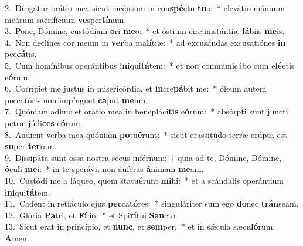 {2.~}Dirigátur orátio mea sicut incénsum in con\textbf{spé}ctu \textbf{tu}o:~* elevátio mánuum meárum sacrifícium \textbf{ve}sper\textbf{tí}num.\\
{3.~}Pone, Dómine, custódiam \textbf{o}ri \textbf{me}o:~* et óstium circumstántiæ \textbf{lá}biis \textbf{me}is.\\
{4.~}Non declínes cor meum in \textbf{ver}ba ma\textbf{lí}tiæ:~* ad excusándas excusatiónes \textbf{in} pec\textbf{cá}tis.\\
{5.~}Cum homínibus operántibus i\textbf{ni}qui\textbf{tá}tem:~* et non communicábo cum e\textbf{lé}ctis e\textbf{ó}rum.\\
{6.~}Corrípiet me justus in misericórdia, et \textbf{in}cre\textbf{pá}bit me:~* óleum autem peccatóris non impínguet \textbf{ca}put \textbf{me}um.\\
{7.~}Quóniam adhuc et orátio mea in benepláci\textbf{tis} e\textbf{ó}rum:~* absórpti sunt juncti petræ júdi\textbf{ces} e\textbf{ó}rum.\\
{8.~}Audient verba mea quóniam \textbf{po}tu\textbf{é}runt:~* sicut crassitúdo terræ erúpta est \textbf{su}per \textbf{ter}ram.\\
{9.~}Dissipáta sunt ossa nostra secus inférnum:~† quia ad te, Dómine, Dómine, \textbf{ó}culi \textbf{me}i:~* in te sperávi, non áuferas \textbf{á}nimam \textbf{me}am.\\
{10.~}Custódi me a láqueo, quem statu\textbf{é}runt \textbf{mi}hi:~* et a scándalis operántium i\textbf{ni}qui\textbf{tá}tem.\\
{11.~}Cadent in retiáculo ejus \textbf{pec}ca\textbf{tó}res:~* singuláriter sum ego \textbf{do}nec \textbf{trán}seam.\\
{12.~}Glória \textbf{Pa}tri, et \textbf{Fí}lio,~* et Spi\textbf{rí}tui \textbf{San}cto.\\
{13.~}Sicut erat in princípio, et \textbf{nunc}, et \textbf{sem}per,~* et in sǽcula sæcu\textbf{ló}rum. \textbf{A}men.\\
